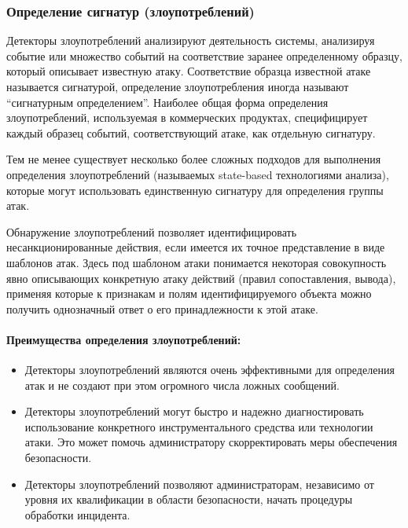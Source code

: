 \subsubsection{Определение сигнатур (злоупотреблений)}

Детекторы злоупотреблений анализируют деятельность системы, анализируя событие или множество событий на соответствие заранее определенному образцу, который описывает известную атаку. Соответствие образца известной атаке называется сигнатурой, определение злоупотребления иногда называют ``сигнатурным определением''. Наиболее общая форма определения злоупотреблений, используемая в коммерческих продуктах, специфицирует каждый образец событий, соответствующий атаке, как отдельную сигнатуру. \autocite{IntrusionDetectionSystemsMsu}

Тем не менее существует несколько более сложных подходов для выполнения определения злоупотреблений (называемых state-based технологиями анализа), которые могут использовать единственную сигнатуру для определения группы атак.


Обнаружение злоупотреблений позволяет идентифицировать несанкционированные действия, если имеется их точное представление в виде шаблонов атак. Здесь под шаблоном атаки понимается некоторая совокупность явно описывающих конкретную атаку действий (правил сопоставления, вывода), применяя которые к признакам и полям идентифицируемого объекта можно получить однозначный ответ о его принадлежности к этой атаке. \autocite{IDSBranitsky}

\paragraph*{Преимущества определения злоупотреблений:}

\begin{itemize}
	\item Детекторы злоупотреблений являются очень эффективными для определения атак и не создают при этом огромного числа ложных сообщений.

	\item Детекторы злоупотреблений могут быстро и надежно диагностировать использование конкретного инструментального средства или технологии атаки. Это может помочь администратору скорректировать меры обеспечения безопасности.
	
	\item Детекторы злоупотреблений позволяют администраторам, независимо от уровня их квалификации в области безопасности, начать процедуры обработки инцидента.
\end{itemize}


